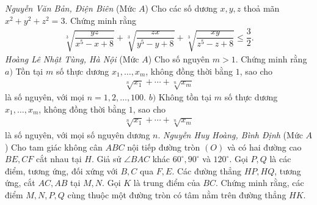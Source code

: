 \begin{multicols}{2}
\begin{figure}[H]
		\vspace*{-15pt}
	\end{figure}
	\hfill	\textit{\small Nguyễn Văn Bản, Điện Biên}
	\vskip 0.05cm
	{}
	(Mức $A$) Cho các số dương $x,y,z$ thoả mãn $x^2+y^2+z^2=3$. Chứng minh rằng
	\begin{align*}
		\sqrt[3]{\dfrac{y z}{x^5\!-\!x\!+\!8}}\!+\!\sqrt[3]{\dfrac{z x}{y^5\!-\!y\!+\!8}}\!+\!\sqrt[3]{\dfrac{x y}{z^5\!-\!z\!+\!8}} \!\le\! \dfrac{3}{2}.
	\end{align*}
	\hfill \textit{Hoàng Lê Nhật Tùng, Hà Nội}
	\vskip 0.05cm
	{}
	(Mức $A$) Cho số nguyên $m>1$. Chứng minh rằng
	\vskip 0.05cm
	$a)$ Tồn tại $m$ số thực dương $x_1,\ldots,x_m$, không đồng thời bằng $1$, sao cho
	\begin{align*}
		\sqrt[n]{x_1}+\cdots+\sqrt[n]{x_m}
	\end{align*}
	là số nguyên, với mọi $n=1,2,\ldots,100$.
	\vskip 0.05cm
	$b)$ Không tồn  tại $m$ số thực dương $x_1,\ldots,x_m$, không đồng thời bằng $1$, sao cho
	\begin{align*}
		\sqrt[n]{x_1}+\cdots+\sqrt[n]{x_m}
	\end{align*}
	là số nguyên, với mọi số nguyên dương $n$.
	\vskip 0.05cm
	\hfill	\textit{\small Nguyễn Huy Hoàng, Bình Định}
	\vskip 0.05cm
	\columnbreak
	{}
	(Mức $A$) Cho tam giác không cân $ABC$ nội tiếp đường tròn $(O)$ và có hai đường cao $BE,CF$ cắt nhau tại $H$. Giả sử   $\angle BAC$ khác $60^\circ,90^\circ$ và $120^\circ$.  Gọi $P, Q$ là các điểm, tương ứng, đối xứng với $B,C $ qua $F, E$. Các đường thẳng $HP, HQ$, tương ứng, cắt $AC, AB$ tại $M, N$.  Gọi $K$ là trung điểm của $BC$. Chứng minh rằng, các điểm $M, N, P, Q$ cùng thuộc một đường tròn có tâm nằm trên đường thẳng $HK$.
	\begin{figure}[H]
		\vspace*{-15pt}
		\centering
		\captionsetup{labelformat= empty, justification=centering}

\end{figure}
\end{multicols}
